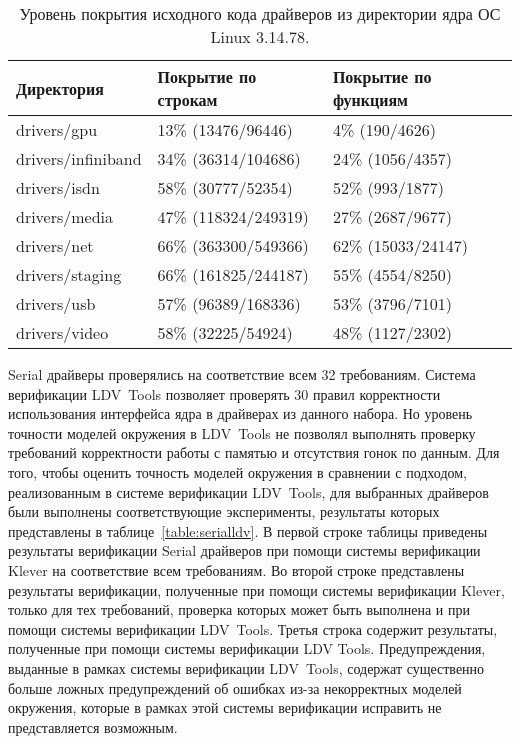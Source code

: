 \begin{table}
\centering
\begin{tabular}{| l | l | l |}
\hline
Директория & Покрытие по строкам & Покрытие по функциям\\
\hline 
drivers/gpu & 13\% (13476/96446)  & 4\% (190/4626) \\  	
\hline
drivers/infiniband & 34\% (36314/104686) &  24\% (1056/4357) \\
\hline
drivers/isdn & 58\% (30777/52354) 	& 52\% (993/1877) \\
\hline
drivers/media &  47\% (118324/249319) & 27\% (2687/9677) \\
\hline
drivers/net & 66\% (363300/549366) & 62\% (15033/24147) \\
\hline
drivers/staging & 66\% (161825/244187) & 55\% (4554/8250) \\
\hline
drivers/usb & 57\% (96389/168336)  & 53\% (3796/7101) \\
\hline
drivers/video & 58\% (32225/54924) & 48\% (1127/2302) \\  
\hline
\end{tabular}
\caption{Уровень покрытия исходного кода драйверов из директории ядра ОС Linux 3.14.78.}
\label{table:drivers}
\end{table}

Serial драйверы проверялись на соответствие всем 32 требованиям.
Система верификации LDV~Tools позволяет проверять 30 правил корректности использования интерфейса ядра в драйверах из данного набора.
Но уровень точности моделей окружения в LDV~Tools не позволял выполнять проверку требований корректности работы с памятью и отсутствия гонок по данным.
Для того, чтобы оценить точность моделей окружения в сравнении с подходом, реализованным в системе верификации LDV~Tools, для выбранных драйверов были выполнены соответствующие эксперименты, результаты которых представлены в таблице~\ref{table:serialldv}.
В первой строке таблицы приведены результаты верификации Serial драйверов при помощи системы верификации Klever на соответствие всем требованиям.
Во второй строке представлены результаты верификации, полученные при помощи системы верификации Klever, только для тех требований, проверка которых может быть выполнена и при помощи системы верификации LDV~Tools.
Третья строка содержит результаты, полученные при помощи системы верификации LDV Tools.
Предупреждения, выданные в рамках системы верификации LDV~Tools, содержат существенно больше ложных предупреждений об ошибках из-за некорректных моделей окружения, которые в рамках этой системы верификации исправить не представляется возможным.

